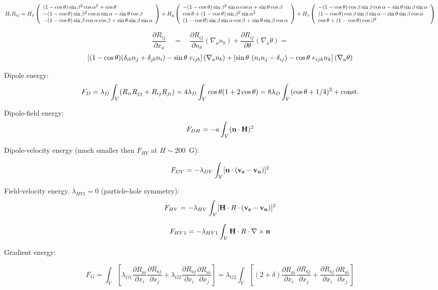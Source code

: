 \documentclass[a4paper]{article}
\begin{document}
$$
H_i R_{ij} =
H_x \left(
\begin{array}{l}
 (1-\cos\theta) \sin\beta^2\cos\alpha^2 + \cos\theta\\
 -(1-\cos\theta) \sin\beta^2\cos\alpha\sin\alpha - \sin\theta\cos\beta\\
 -(1-\cos\theta) \sin\beta\cos\alpha\cos\beta + \sin\theta\sin\beta\sin\alpha\\
\end{array}
\right)
+H_y \left(
\begin{array}{l}
 -(1-\cos\theta) \sin\beta^2\sin\alpha\cos\alpha + \sin\theta\cos\beta\\
 \cos\theta + (1-\cos\theta) \sin\beta^2\sin\alpha^2\\
 (1-\cos\theta) \sin\beta\sin\alpha\cos\beta +\sin\theta\sin\beta\cos\alpha\\
\end{array}
\right)
+H_z \left(
\begin{array}{l}
 -(1-\cos\theta) \cos\beta\sin\beta\cos\alpha - \sin\theta\sin\beta\sin\alpha\\
 (1-\cos\theta) \cos\beta\sin\beta\sin\alpha - \sin\theta\sin\beta\cos\alpha\\
 \cos\theta + (1-\cos\theta) \cos\beta^2\\
\end{array}
\right)
$$





$$
\frac{\partial R_{ij}}{\partial x_a} \quad=\quad
\frac{\partial R_{ij}}{\partial n_b} (\nabla_a n_b) +
\frac{\partial R_{ij}}{\partial \theta} (\nabla_a \theta) =
$$
$$
\left[  (1-\cos\theta) (\delta_{ib} n_j + \delta_{jb} n_i) - \sin\theta\ e_{ijb}
\right] (\nabla_a n_b) +
\left[  \sin\theta\ (n_i n_j - \delta_{ij}) - \cos\theta\ e_{ijk} n_k
\right] (\nabla_a \theta)
$$

Dipole energy:
$$
F_D = \lambda_D\int_V (R_{ii}R_{jj} + R_{ij}R_{ji}) =
      4\lambda_D\int_V \cos\theta(1+2\cos\theta) =
      8\lambda_D\int_V (\cos\theta+1/4)^2 + {\rm const.}
$$

Dipole-field energy:
$$
F_{DH} = - a \int_V ({\bf n}\cdot{\bf H})^2
$$

Dipole-velocity energy (much smaller then $F_{HV}$ at $H \sim 200$~G):

$$
F_{DV} = - \lambda_{DV} \int_V [{\bf n}\cdot{(\bf v_s - v_n)}]^2
$$

Field-velocity energy. $\lambda_{HV1}=0$ (particle-hole symmetry):
$$
F_{HV} = - \lambda_{HV} \int_V [{\bf H}\cdot R \cdot {(\bf v_s - v_n)}]^2
$$

$$
F_{HV1} = - \lambda_{HV1} \int_V {\bf H}\cdot R \cdot \nabla\times{\bf n}
$$

Gradient energy:

$$
F_{G} =  \int_V \left[
\lambda_{G1}
\frac{\partial R_{ai}}{\partial x_i}
\frac{\partial R_{aj}}{\partial x_j} +
\lambda_{G2}
\frac{\partial R_{aj}}{\partial x_i}
\frac{\partial R_{ai}}{\partial x_j}
\right]
= \lambda_{G2}
\int_V \left[
(2+\delta)
\frac{\partial R_{ai}}{\partial x_i}
\frac{\partial R_{aj}}{\partial x_j} +
\frac{\partial R_{aj}}{\partial x_i}
\frac{\partial R_{ai}}{\partial x_j}
\right]
$$
\end{document}
